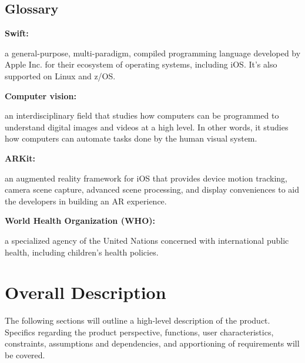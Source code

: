 \documentclass[letterpaper,10pt,draftclsnofoot,onecolumn,compsoc]{IEEEtran}
\begin{document}
\subsection{Glossary}
\begin{singlespace}

\begin{enumerate}[labelsep=2em,leftmargin=.5in]
    {\item \bfseries Swift: } a general-purpose, multi-paradigm, compiled programming language developed by Apple Inc. for their ecosystem of operating systems, including iOS. It's also supported on Linux and z/OS.
    
    {\item \bfseries Computer vision: } an interdisciplinary field that studies how computers can be programmed to understand digital images and videos at a high level. In other words, it studies how computers can automate tasks done by the human visual system.
    
    {\item \bfseries ARKit: } an augmented reality framework for iOS that provides device motion tracking, camera scene capture, advanced scene processing, and display conveniences to aid the developers in building an AR experience.
    
    {\item \bfseries World Health Organization (WHO): } a specialized agency of the United Nations concerned with international public health, including children's health policies.
\end{enumerate}
\end{singlespace}


\section{Overall Description}
\begin{singlespace}
\noindent
The following sections will outline a high-level description of the product. Specifics regarding the product perspective, functions, user characteristics, constraints, assumptions and dependencies, and apportioning of requirements will be covered.
\end{singlespace}
\end{document}
